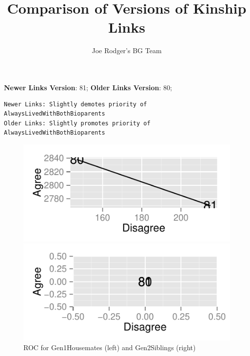 \documentclass[a4paper]{article}\usepackage[]{graphicx}\usepackage[]{color}
\title{Comparison of Versions of Kinship Links}
\author{Joe Rodger's BG Team}
\makeatletter
\def\maxwidth{ %
  \ifdim\Gin@nat@width>\linewidth
    \linewidth
  \else
    \Gin@nat@width
  \fi
}
\newenvironment{kframe}{%
 \def\at@end@of@kframe{}%
 \ifinner\ifhmode%
  \def\at@end@of@kframe{\end{minipage}}%
  \begin{minipage}{\columnwidth}%
 \fi\fi%
 \def\FrameCommand##1{\hskip\@totalleftmargin \hskip-\fboxsep
 \colorbox{shadecolor}{##1}\hskip-\fboxsep
     \hskip-\linewidth \hskip-\@totalleftmargin \hskip\columnwidth}%
 \MakeFramed {\advance\hsize-\width
   \@totalleftmargin\z@ \linewidth\hsize
   \@setminipage}}%
 {\par\unskip\endMakeFramed%
 \at@end@of@kframe}
\newenvironment{knitrout}{}{} %
\makeatother
\begin{document}
\maketitle

\setlength{\parindent}{0pt}%







\textbf{Newer Links Version}: 81;
\textbf{Older Links Version}: 80;

\begin{knitrout}
\color{fgcolor}\begin{kframe}
\begin{verbatim}
Newer Links: Slightly demotes priority of AlwaysLivedWithBothBioparents
Older Links: Slightly promotes priority of AlwaysLivedWithBothBioparents
\end{verbatim}
\end{kframe}
\end{knitrout}


\begin{figure}[htbp]
\begin{knitrout}
\color{fgcolor}
\includegraphics[width=\maxwidth]{figure/unnamed-chunk-31} 

\includegraphics[width=\maxwidth]{figure/unnamed-chunk-32} 

\end{knitrout}

\caption{ROC for Gen1Housemates (left) and Gen2Siblings (right)}
\end{figure}
\end{document}
